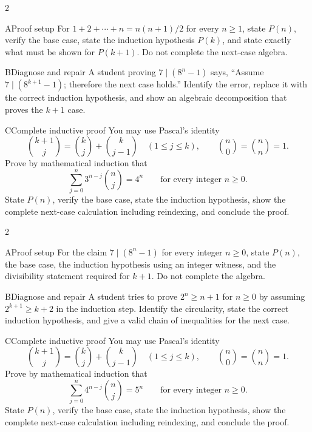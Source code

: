 \documentclass[9pt]{extarticle}
\begin{document}
\CoreWorkArea
\FormBreak
{}
\begin{multicols}{2}
\begin{CompactCoreProblem}{A}{Proof setup}
For $1+2+\cdots+n=n(n+1)/2$ for every $n\ge1$, state $P(n)$, verify the base case, state the induction hypothesis $P(k)$, and state exactly what must be shown for $P(k+1)$. Do not complete the next-case algebra.
\end{CompactCoreProblem}
\begin{CompactCoreProblem}{B}{Diagnose and repair}
A student proving $7\mid(8^n-1)$ says, “Assume $7\mid(8^{k+1}-1)$; therefore the next case holds.” Identify the error, replace it with the correct induction hypothesis, and show an algebraic decomposition that proves the $k+1$ case.
\end{CompactCoreProblem}
\end{multicols}
\begin{CompactCoreProblem}{C}{Complete inductive proof}
You may use Pascal's identity
\[
\binom{k+1}{j}=\binom{k}{j}+\binom{k}{j-1}
\quad(1\le j\le k),\qquad
\binom{n}{0}=\binom{n}{n}=1.
\]
Prove by mathematical induction that
\[
\sum_{j=0}^{n} 3^{n-j}\binom{n}{j}=4^n\qquad\text{for every integer }n\ge0.
\]
State $P(n)$, verify the base case, state the induction hypothesis, show the complete next-case calculation including reindexing, and conclude the proof.
\end{CompactCoreProblem}
\CoreWorkArea
\FormBreak
{}
\begin{multicols}{2}
\begin{CompactCoreProblem}{A}{Proof setup}
For the claim $7\mid(8^n-1)$ for every integer $n\ge0$, state $P(n)$, the base case, the induction hypothesis using an integer witness, and the divisibility statement required for $k+1$. Do not complete the algebra.
\end{CompactCoreProblem}
\begin{CompactCoreProblem}{B}{Diagnose and repair}
A student tries to prove $2^n\ge n+1$ for $n\ge0$ by assuming $2^{k+1}\ge k+2$ in the induction step. Identify the circularity, state the correct induction hypothesis, and give a valid chain of inequalities for the next case.
\end{CompactCoreProblem}
\end{multicols}
\begin{CompactCoreProblem}{C}{Complete inductive proof}
You may use Pascal's identity
\[
\binom{k+1}{j}=\binom{k}{j}+\binom{k}{j-1}
\quad(1\le j\le k),\qquad
\binom{n}{0}=\binom{n}{n}=1.
\]
Prove by mathematical induction that
\[
\sum_{j=0}^{n} 4^{n-j}\binom{n}{j}=5^n\qquad\text{for every integer }n\ge0.
\]
State $P(n)$, verify the base case, state the induction hypothesis, show the complete next-case calculation including reindexing, and conclude the proof.
\end{CompactCoreProblem}
\end{document}
